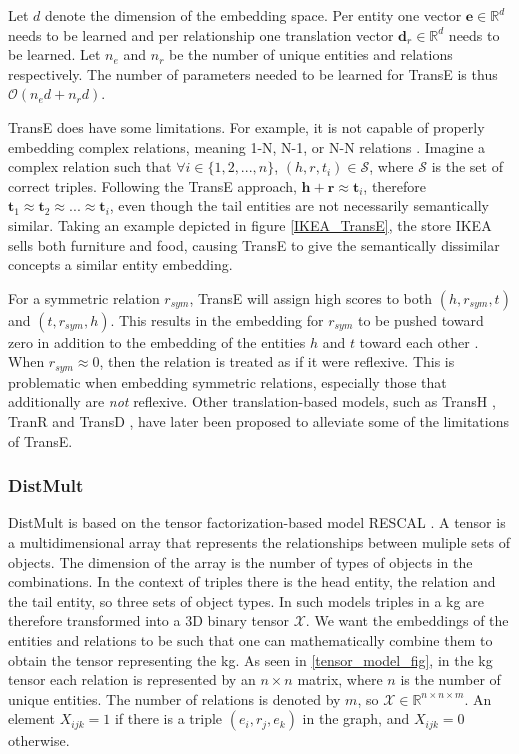 Let $d$ denote the dimension of the embedding space. Per entity one vector $\textbf{e}\in \mathbb{R}^d$ needs to be learned and per relationship one translation vector $\textbf{d}_r\in \mathbb{R}^d$ needs to be learned. Let $n_e$ and $n_r$ be the number of unique entities and relations respectively. The number of parameters needed to be learned for TransE is thus $\mathcal{O}(n_e d + n_r d)$.


TransE does have some limitations. For example, it is not capable of properly embedding complex relations, meaning 1-N, N-1, or N-N relations \cite{transH, transR}. Imagine a complex relation such that $\forall i \in \{1,2, ..., n\}$, $(h, r, t_i )\in \mathcal{S}$, where $\mathcal{S}$ is the set of correct triples. Following the TransE approach, $\textbf{h}+\textbf{r}\approx \textbf{t}_i$, therefore $\textbf{t}_1 \approx \textbf{t}_2 \approx ... \approx \textbf{t}_i$, even though the tail entities are not necessarily semantically similar. Taking an example depicted in figure \ref{IKEA_TransE}, the store IKEA sells both furniture and food, causing TransE to give the semantically dissimilar concepts a similar entity embedding. 

For a symmetric relation $r_{sym}$, TransE will assign high scores to both $(h, r_{sym}, t)$ and $(t, r_{sym}, h)$. This results in the embedding for $r_{sym}$ to be pushed toward zero in addition to the embedding of the entities $h$ and $t$ toward each other \cite{wang2018evaluating}. When $r_{sym} \approx 0$, then the relation is treated as if it were reflexive. This is problematic when embedding symmetric relations, especially those that additionally are \textit{not} reflexive. Other translation-based models, such as TransH \cite{transH}, TranR \cite{transR} and TransD \cite{transD}, have later been proposed to alleviate some of the limitations of TransE.

\subsubsection{DistMult}
DistMult is based on the tensor factorization-based model RESCAL \cite{RESCAL}. A tensor is a multidimensional array that represents the relationships between muliple sets of objects. The dimension of the array is the number of types of objects in the combinations. In the context of triples there is the head entity, the relation and the tail entity, so three sets of object types. In such models triples in a \gls{kg} are therefore transformed into a 3D binary tensor $\mathcal{X}$. We want the embeddings of the entities and relations to be such that one can mathematically combine them to obtain the tensor representing the \gls{kg}. As seen in \cref{tensor_model_fig}, in the \gls{kg} tensor each relation is represented by an $n \times n$ matrix, where $n$ is the number of unique entities. The number of relations is denoted by $m$, so $\mathcal{X}\in \mathbb{R}^{n \times n \times m}$. An element $X_{ijk} = 1$ if there is a triple $(e_i, r_j, e_k)$ in the graph, and $X_{ijk} = 0$ otherwise.

